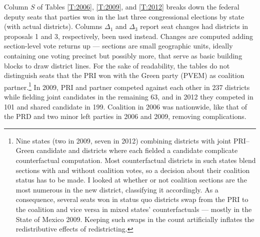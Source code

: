 \documentclass[letter,12pt]{article}
\begin{document}

Column $S$ of Tables \ref{T:2006}, \ref{T:2009}, and \ref{T:2012} breaks down the federal deputy seats that parties won in the last three congressional elections by state (with actual districts). Columns $\Delta_1$ and $\Delta_3$ report seat changes had districts in proposals 1 and 3, respectively, been used instead. Changes are computed adding section-level vote returns up --- sections are small geographic units, ideally containing one voting precinct but possibly more, that serve as basic building blocks to draw district lines. For the sake of readability, the tables do not distinguish seats that the PRI won with the Green party (PVEM) as coalition partner.\footnote{Nine states (two in 2009, seven in 2012) combining districts with joint PRI--Green candidate and districts where each fielded a candidate complicate counterfactual computation. Most counterfactual districts in such states blend sections with and without coalition votes, so a decision about their coalition status has to be made. I looked at whether or not coalition sections are the most numerous in the new district, classifying it accordingly. As a consequence, several seats won in status quo districts swap from the PRI to the coalition and vice versa in mixed states' counterfactuals --- mostly in the State of Mexico 2009. Keeping such swaps in the count artificially inflates the redistributive effects of redistricting.} In 2009, PRI and partner competed against each other in 237 districts while fielding joint candidates in the remaining 63, and in 2012 they competed in 101 and shared candidate in 199. Coalition in 2006 was nationwide, like that of the PRD and two minor left parties in 2006 and 2009, removing complications. 

\end{document}
